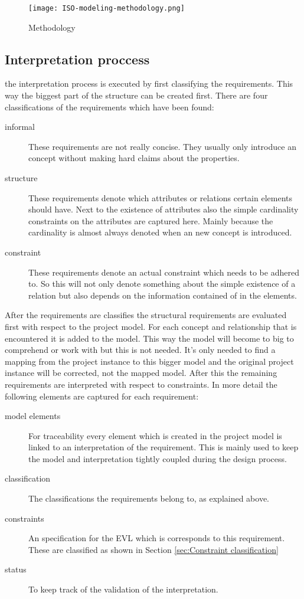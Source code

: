 \documentclass[a4paper]{article}
\newcommand{\EVL}{EVL\xspace}
\begin{document}
\begin{figure}[ht]
\centering
\texttt{[image: ISO-modeling-methodology.png]}
\caption{Methodology}
\label{fig:ISO-modeling-methodology}
\end{figure}

\subsection{Interpretation proccess} \label{sec:interpretation}
the interpretation process is executed by first classifying the requirements.
This way the biggest part of the structure can be created first.
There are four classifications of the requirements which have been found:
\begin{description}
\item[informal] These requirements are not really concise. They usually only introduce an concept without making hard claims about the properties.
\item[structure] These requirements denote which attributes or relations certain elements should have. Next to the existence of attributes also the simple cardinality constraints on the attributes are captured here. Mainly because the cardinality is almost always denoted when an new concept is introduced.
\item[constraint] These requirements denote an actual constraint which needs to be adhered to. So this will not only denote something about the simple existence of a relation but also depends on the information contained of in the elements.
\end{description}

After the requirements are classifies the structural requirements are evaluated first with respect to the project model.
For each concept and relationship that is encountered it is added to the model.
This way the model will become to big to comprehend or work with but this is not needed.
It's only needed to find a mapping from the project instance to this bigger model and the original project instance will be corrected, not the mapped model.
After this the remaining requirements are interpreted with respect to constraints.
In more detail the following elements are captured for each requirement:
\begin{description}
\item[model elements] For traceability every element which is created in the project model is linked to an interpretation of the requirement. This is mainly used to keep the model and interpretation tightly coupled during the design process.
\item[classification] The classifications the requirements belong to, as explained above.
\item[constraints] An specification for the \EVL which is corresponds to this requirement. These are classified as shown in Section \ref{sec:Constraint classification}
\item[status] To keep track of the validation of the interpretation.
\end{description}
\end{document}

